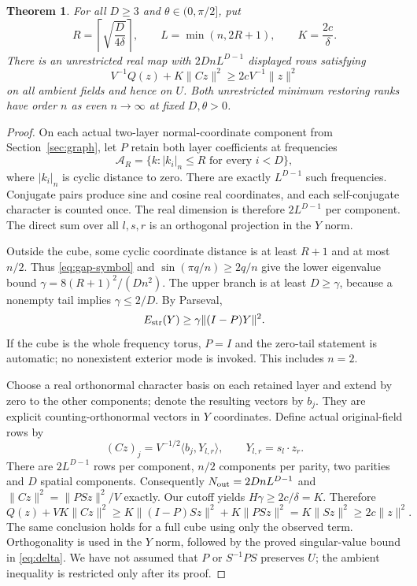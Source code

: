 \documentclass[11pt,a4paper]{article}
\newtheorem{theorem}{Theorem}[section]
\newcommand{\norm}[1]{\lVert#1\rVert}
\newcommand{\ip}[2]{\langle#1,#2\rangle}
\begin{document}
\begin{theorem}\label{thm:angle}
For all $D\geq3$ and $\theta\in(0,\pi/2]$, put
\[
 R=\left\lceil\sqrt{\frac{D}{4\delta}}\right\rceil,\qquad
 L=\min(n,2R+1),\qquad K=\frac{2c}{\delta}.
\]
There is an unrestricted real map with $2DnL^{D-1}$ displayed rows satisfying
\begin{equation}\label{eq:angleupper}
 V^{-1}Q(z)+K\norm{Cz}^2\geq2cV^{-1}\norm z^2
\end{equation}
on all ambient fields and hence on $U$. Both unrestricted minimum restoring
ranks have order $n$ as even $n\to\infty$ at fixed $D,\theta>0$.
\end{theorem}
\begin{proof}
On each actual two-layer normal-coordinate component from
Section~\ref{sec:graph}, let $P$ retain both layer coefficients at frequencies
\[
 \mathcal A_R=\{k:|k_i|_n\leq R\text{ for every }i<D\},
\]
where $|k_i|_n$ is cyclic distance to zero. There are exactly $L^{D-1}$ such
frequencies. Conjugate pairs produce sine and cosine real coordinates, and
each self-conjugate character is counted once. The real dimension is therefore
$2L^{D-1}$ per component. The direct sum over all $l,s,r$ is an orthogonal
projection in the $Y$ norm.

Outside the cube, some cyclic coordinate distance is at least $R+1$ and at
most $n/2$. Thus \eqref{eq:gap-symbol} and $\sin(\pi q/n)\geq2q/n$ give
the lower eigenvalue bound $\gamma=8(R+1)^2/(Dn^2)$. The upper branch is
at least $D\geq\gamma$, because a nonempty tail implies
$\gamma\leq2/D$. By Parseval,
\[
 E_{\rm str}(Y)\geq\gamma\norm{(I-P)Y}^2.
\]
If the cube is the whole frequency torus, $P=I$ and the zero-tail statement
is automatic; no nonexistent exterior mode is invoked. This includes $n=2$.

Choose a real orthonormal character basis on each retained layer and extend
by zero to the other components; denote the resulting vectors by $b_j$.
They are explicit counting-orthonormal vectors in $Y$ coordinates. Define
actual original-field rows by
\[
 (Cz)_j=V^{-1/2}\ip{b_j}{Y_{l,r}},\qquad Y_{l,r}=s_l\cdot z_r.
\]
There are $2L^{D-1}$ rows per component, $n/2$ components per parity,
two parities and $D$ spatial components. Consequently
$N_{\rm out}=2DnL^{D-1}$ and $\norm{Cz}^2=\norm{PSz}^2/V$ exactly.
Our cutoff yields $H\gamma\geq2c/\delta=K$. Therefore
\[
 Q(z)+VK\norm{Cz}^2\geq
 K\norm{(I-P)Sz}^2+K\norm{PSz}^2
 =K\norm{Sz}^2\geq2c\norm z^2.
\]
The same conclusion holds for a full cube using only the observed term.
Orthogonality is used in the $Y$ norm, followed by the proved singular-value
bound in \eqref{eq:delta}. We have not assumed that $P$ or $S^{-1}PS$
preserves $U$; the ambient inequality is restricted only after its proof.


\end{proof}
\end{document}
